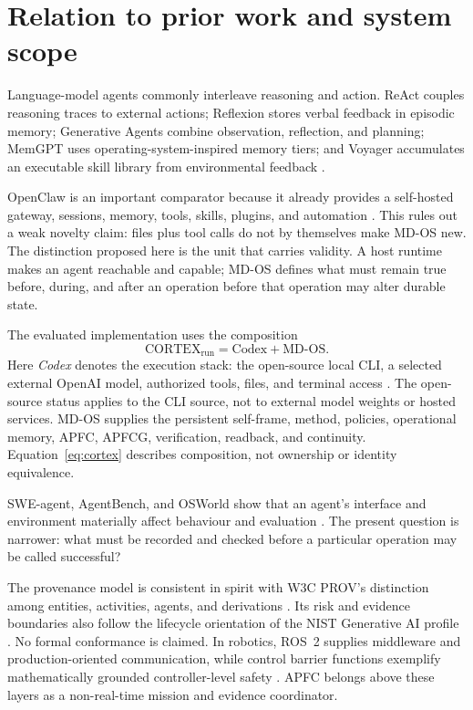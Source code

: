 \documentclass[10pt,twocolumn]{article}
\theoremstyle{definition}
\theoremstyle{plain}
\theoremstyle{remark}
\begin{document}
\section{Relation to prior work and system scope}

Language-model agents commonly interleave reasoning and action.  ReAct couples reasoning traces to external actions; Reflexion stores verbal feedback in episodic memory; Generative Agents combine observation, reflection, and planning; MemGPT uses operating-system-inspired memory tiers; and Voyager accumulates an executable skill library from environmental feedback \citep{yao2023react,shinn2023reflexion,park2023generative,packer2023memgpt,wang2023voyager}.

OpenClaw is an important comparator because it already provides a self-hosted gateway, sessions, memory, tools, skills, plugins, and automation \citep{openclaw2026docs,openclaw2026tools}.  This rules out a weak novelty claim: files plus tool calls do not by themselves make MD-OS new.  The distinction proposed here is the unit that carries validity.  A host runtime makes an agent reachable and capable; MD-OS defines what must remain true before, during, and after an operation before that operation may alter durable state.

The evaluated implementation uses the composition
\begin{equation}
\mathrm{CORTEX}_{\mathrm{run}} = \mathrm{Codex} + \mathrm{MD\mbox{-}OS}.
\label{eq:cortex}
\end{equation}
Here \emph{Codex} denotes the execution stack: the open-source local CLI, a selected external OpenAI model, authorized tools, files, and terminal access \citep{openai2026opensource,openai2026codexrepo,openai2026codexcli}.  The open-source status applies to the CLI source, not to external model weights or hosted services.  MD-OS supplies the persistent self-frame, method, policies, operational memory, APFC, APFCG, verification, readback, and continuity.  Equation~\eqref{eq:cortex} describes composition, not ownership or identity equivalence.

SWE-agent, AgentBench, and OSWorld show that an agent's interface and environment materially affect behaviour and evaluation \citep{yang2024sweagent,liu2024agentbench,xie2024osworld}.  The present question is narrower: what must be recorded and checked before a particular operation may be called successful?

The provenance model is consistent in spirit with W3C PROV's distinction among entities, activities, agents, and derivations \citep{moreau2013prov}.  Its risk and evidence boundaries also follow the lifecycle orientation of the NIST Generative AI profile \citep{nist2024genai}.  No formal conformance is claimed.  In robotics, ROS~2 supplies middleware and production-oriented communication, while control barrier functions exemplify mathematically grounded controller-level safety \citep{macenski2022ros2,ames2019cbf}.  APFC belongs above these layers as a non-real-time mission and evidence coordinator.
\end{document}
